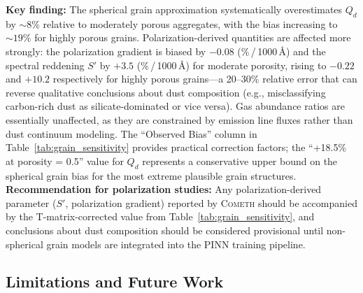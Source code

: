 \documentclass[usenatbib]{mnras}
\begin{document}
\textbf{Key finding:} The spherical grain approximation systematically overestimates $Q_d$ by $\sim 8\%$ relative to moderately porous aggregates, with the bias increasing to $\sim 19\%$ for highly porous grains. Polarization-derived quantities are affected more strongly: the polarization gradient is biased by $-0.08$ (\%\,/\,1000\,\AA) and the spectral reddening $S'$ by $+3.5$ (\%\,/\,1000\,\AA) for moderate porosity, rising to $-0.22$ and $+10.2$ respectively for highly porous grains---a 20--30\% relative error that can reverse qualitative conclusions about dust composition (e.g., misclassifying carbon-rich dust as silicate-dominated or vice versa). Gas abundance ratios are essentially unaffected, as they are constrained by emission line fluxes rather than dust continuum modeling. The ``Observed Bias'' column in Table~\ref{tab:grain_sensitivity} provides practical correction factors; the ``+18.5\% at porosity = 0.5'' value for $Q_d$ represents a conservative upper bound on the spherical grain bias for the most extreme plausible grain structures. \textbf{Recommendation for polarization studies:} Any polarization-derived parameter ($S'$, polarization gradient) reported by \textsc{Cometh} should be accompanied by the T-matrix-corrected value from Table~\ref{tab:grain_sensitivity}, and conclusions about dust composition should be considered provisional until non-spherical grain models are integrated into the PINN training pipeline.

\subsection{Limitations and Future Work}\label{sec:limitations}
\end{document}
